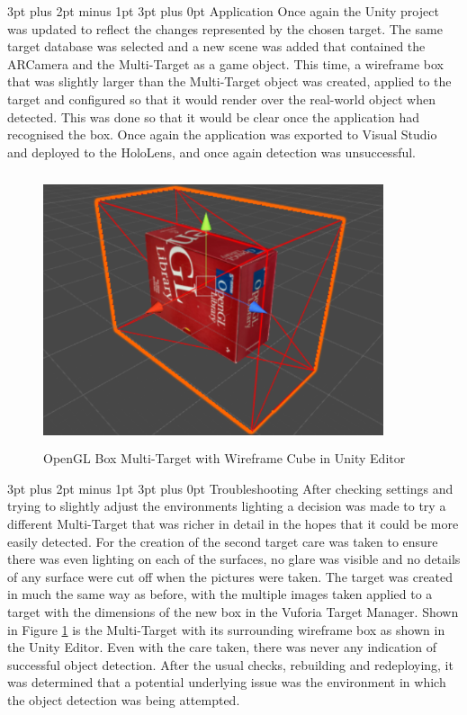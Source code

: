 \documentclass[12pt,a4paper,oneside]{article}
\makeatletter
\renewcommand\paragraph{\@startsection {paragraph}{1}{0mm} %
	                           {3pt plus 2pt minus 1pt} %
	                           {3pt plus 0pt} %
	                           {\normalfont}}
\makeatother
\begin{document}
\paragraph{Application}
Once again the Unity project was updated to reflect the changes represented by the chosen target. The same target database was selected and a new scene was added that contained the ARCamera and the Multi-Target as a game object. This time, a wireframe box that was slightly larger than the Multi-Target object was created, applied to the target and configured so that it would render over the real-world object when detected. This was done so that it would be clear once the application had recognised the box. Once again the application was exported to Visual Studio and deployed to the HoloLens, and once again detection was unsuccessful.

\begin{figure}[!h]
	\centering
	\includegraphics[width=10cm,height=8cm,keepaspectratio]{images/openglbox}
	\caption[OpenGL Box Multi-Target in Unity]{OpenGL Box Multi-Target with Wireframe Cube in Unity Editor}
	\label{fig_openglbox}
\end{figure}

\paragraph{Troubleshooting}
After checking settings and trying to slightly adjust the environments lighting a decision was made to try a different Multi-Target that was richer in detail in the hopes that it could be more easily detected. For the creation of the second target care was taken to ensure there was even lighting on each of the surfaces, no glare was visible and no details of any surface were cut off when the pictures were taken. The target was created in much the same way as before, with the multiple images taken applied to a target with the dimensions of the new box in the Vuforia Target Manager. Shown in Figure \ref{fig_openglbox} is the Multi-Target with its surrounding wireframe box as shown in the Unity Editor. Even with the care taken, there was never any indication of successful object detection. After the usual checks, rebuilding and redeploying, it was determined that a potential underlying issue was the environment in which the object detection was being attempted.
\end{document}
